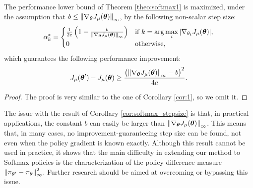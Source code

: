 \begin{corollary}\label{cor:softmax_stepsize}
The performance lower bound of Theorem \ref{theo:softmax1} is maximized, under the assumption that $b\leq \norm[\infty]{\gradJ{\vtheta}}$, by the following non-scalar step size:
\[ \alpha_{k}^*=	
\begin{cases}
	\frac{1}
		{2c}\left(1-\frac{b}{\norm[\infty]{\gradJ{\vtheta}}}\right) & 
		\text{if } k = \arg\max\limits_i |\gradJ{\theta_i}|,	\\
		0 & \text{otherwise},
\end{cases}
\]
which guarantees the following performance improvement: 
\[
\DeltaJ \geq \frac{\left(\norm[\infty]{\gradJ{\vtheta}} - b\right)^2}{4c}.
\]
\end{corollary}
\begin{proof}
The proof is very similar to the one of Corollary \ref{cor:1}, so we omit it.
\end{proof}

The issue with the result of Corollary \ref{cor:softmax_stepsize} is that, in practical applications, the constant $b$ can easily be larger than $\norm[\infty]{\gradJ{\vtheta}}$. This means that, in many cases, no improvement-guaranteeing step size can be found, not even when the policy gradient is known exactly.
Although this result cannot be used in practice, it shows that the main difficulty in extending our method to Softmax policies is the characterization of the policy difference measure $\norm[\infty]{\pi_{\vtheta'} - \pi_{\vtheta}}^2$. Further research should be aimed at overcoming or bypassing this issue.